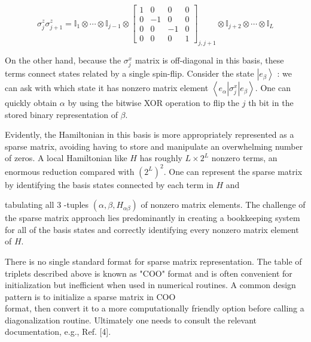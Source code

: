 \documentclass[12pt]{article}
\begin{document}
\[
\sigma_{j}^{z} \sigma_{j+1}^{z}=\mathbb{I}_{1} \otimes \cdots \otimes \mathbb{I}_{j-1} \otimes\left[\begin{array}{cccc}
1 & 0 & 0 & 0  \tag{10}\\
0 & -1 & 0 & 0 \\
0 & 0 & -1 & 0 \\
0 & 0 & 0 & 1
\end{array}\right]_{j, j+1} \otimes \mathbb{I}_{j+2} \otimes \cdots \otimes \mathbb{I}_{L}
\]

On the other hand, because the $\sigma_{j}^{x}$ matrix is off-diagonal in this basis, these terms connect states related by a single spin-flip. Consider the state $\left|e_{\beta}\right\rangle$ : we can ask with which state it has nonzero matrix element $\left\langle e_{\alpha}\left|\sigma_{j}^{x}\right| e_{\beta}\right\rangle$. One can quickly obtain $\alpha$ by using the bitwise XOR operation to flip the $j$ th bit in the stored binary representation of $\beta$.

Evidently, the Hamiltonian in this basis is more appropriately represented as a sparse matrix, avoiding having to store and manipulate an overwhelming number of zeros. A local Hamiltonian like $H$ has roughly $L \times 2^{L}$ nonzero terms, an enormous reduction compared with $\left(2^{L}\right)^{2}$. One can represent the sparse matrix by identifying the basis states connected by each term in $H$ and

tabulating all 3 -tuples $\left(\alpha, \beta, H_{\alpha \beta}\right)$ of nonzero matrix elements. The challenge of the sparse matrix approach lies predominantly in creating a bookkeeping system for all of the basis states and correctly identifying every nonzero matrix element of $H$.

There is no single standard format for sparse matrix representation. The table of triplets described above is known as "COO" format and is often convenient for initialization but inefficient when used in numerical routines. A common design pattern is to initialize a sparse matrix in COO\\
format, then convert it to a more computationally friendly option before calling a diagonalization routine. Ultimately one needs to consult the relevant documentation, e.g., Ref. [4].
\end{document}
